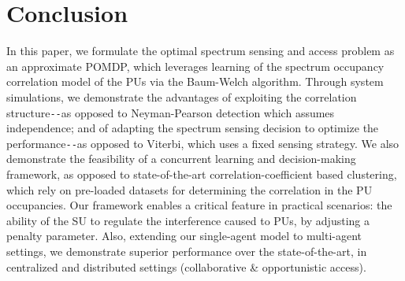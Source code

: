 \documentclass[10pt, twocolumn]{IEEEtran}
\begin{document}
\section{Conclusion}\label{V}
In this paper, we formulate the optimal spectrum sensing and access problem as an approximate POMDP, which leverages learning of the spectrum occupancy correlation model of the PUs via the Baum-Welch algorithm. Through system simulations, we demonstrate the advantages of exploiting the correlation structure\texttt{-{}-}as opposed to Neyman-Pearson detection which assumes independence; and of adapting the spectrum sensing decision to optimize the performance\texttt{-{}-}as opposed to Viterbi, which uses a fixed sensing strategy. We also demonstrate the feasibility of a concurrent learning and decision-making framework, as opposed to state-of-the-art correlation-coefficient based clustering, which rely on pre-loaded datasets for determining the correlation in the PU occupancies. Our framework enables a critical feature in practical scenarios: the ability of the SU to regulate the interference caused to PUs, by adjusting a penalty parameter. Also, extending our single-agent model to multi-agent settings, we demonstrate superior performance over the state-of-the-art, in centralized and distributed settings (collaborative \& opportunistic access).
\vspace{-7mm}


\end{document}
